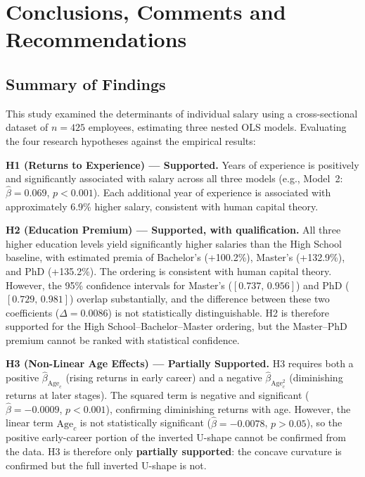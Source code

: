 \documentclass[12pt, a4paper]{article}
\begin{document}
\section{Conclusions, Comments and Recommendations}

\subsection{Summary of Findings}
This study examined the determinants of individual salary using a cross-sectional dataset of $n = 425$ employees, estimating three nested OLS models. Evaluating the four research hypotheses against the empirical results:

\textbf{H1 (Returns to Experience) --- Supported.} Years of experience is positively and significantly associated with salary across all three models (e.g., Model~2: $\hat{\beta} = 0.069$, $p < 0.001$). Each additional year of experience is associated with approximately 6.9\% higher salary, consistent with human capital theory.

\textbf{H2 (Education Premium) --- Supported, with qualification.} All three higher education levels yield significantly higher salaries than the High School baseline, with estimated premia of Bachelor's (+100.2\%), Master's (+132.9\%), and PhD (+135.2\%). The ordering is consistent with human capital theory. However, the 95\% confidence intervals for Master's ($[0.737,\,0.956]$) and PhD ($[0.729,\,0.981]$) overlap substantially, and the difference between these two coefficients ($\Delta = 0.0086$) is not statistically distinguishable. H2 is therefore supported for the High School--Bachelor--Master ordering, but the Master--PhD premium cannot be ranked with statistical confidence.

\textbf{H3 (Non-Linear Age Effects) --- Partially Supported.} H3 requires both a positive $\hat{\beta}_{\text{Age}_c}$ (rising returns in early career) and a negative $\hat{\beta}_{\text{Age}_c^2}$ (diminishing returns at later stages). The squared term is negative and significant ($\hat{\beta} = -0.0009$, $p < 0.001$), confirming diminishing returns with age. However, the linear term $\text{Age}_c$ is not statistically significant ($\hat{\beta} = -0.0078$, $p > 0.05$), so the positive early-career portion of the inverted U-shape cannot be confirmed from the data. H3 is therefore only \textbf{partially supported}: the concave curvature is confirmed but the full inverted U-shape is not.
\end{document}
